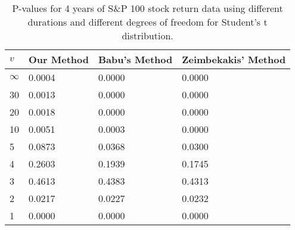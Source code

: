 \begin{table}[ht]
\centering
\caption{P-values for 4 years of S\&P 100 stock return 
                   data using different durations
  and different degrees of freedom for Student's t distribution.} 
\label{table:SP1004}
\begin{tabular}{llll}
  \hline
$v$ & Our Method & Babu's Method & Zeimbekakis' Method \\ 
  \hline
$\infty$ & 0.0004 & 0.0000 & 0.0000 \\ 
  30 & 0.0013 & 0.0000 & 0.0000 \\ 
  20 & 0.0018 & 0.0000 & 0.0000 \\ 
  10 & 0.0051 & 0.0003 & 0.0000 \\ 
  5 & 0.0873 & 0.0368 & 0.0300 \\ 
  4 & 0.2603 & 0.1939 & 0.1745 \\ 
  3 & 0.4613 & 0.4383 & 0.4313 \\ 
  2 & 0.0217 & 0.0227 & 0.0232 \\ 
  1 & 0.0000 & 0.0000 & 0.0000 \\ 
   \hline
\end{tabular}
\end{table}

